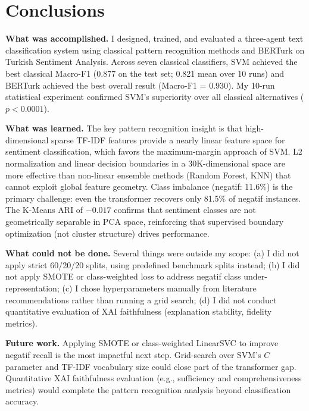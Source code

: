 \documentclass[conference]{IEEEtran}
\begin{document}
\section{Conclusions}
\label{sec:conclusion}

\textbf{What was accomplished.} I designed, trained, and evaluated a three-agent text
classification system using classical pattern recognition methods and BERTurk on Turkish
Sentiment Analysis. Across seven classical classifiers, SVM achieved the best classical
Macro-F1 (0.877 on the test set; 0.821 mean over 10 runs) and BERTurk achieved the best
overall result (Macro-F1 = 0.930). My 10-run statistical experiment confirmed SVM's
superiority over all classical alternatives ($p < 0.0001$).

\textbf{What was learned.} The key pattern recognition insight is that high-dimensional
sparse TF-IDF features provide a nearly linear feature space for sentiment classification,
which favors the maximum-margin approach of SVM. L2 normalization and linear decision
boundaries in a 30K-dimensional space are more effective than non-linear ensemble
methods (Random Forest, KNN) that cannot exploit global feature geometry. Class imbalance
(negatif: 11.6\%) is the primary challenge: even the transformer recovers only 81.5\%
of negatif instances. The K-Means ARI of $-0.017$ confirms that sentiment classes are
not geometrically separable in PCA space, reinforcing that supervised boundary
optimization (not cluster structure) drives performance.

\textbf{What could not be done.} Several things were outside my scope: (a) I did not
apply strict 60/20/20 splits, using predefined benchmark splits instead; (b) I did not
apply SMOTE or class-weighted loss to address negatif class under-representation;
(c) I chose hyperparameters manually from literature recommendations rather than
running a grid search; (d) I did not conduct quantitative evaluation of XAI faithfulness
(explanation stability, fidelity metrics).

\textbf{Future work.} Applying SMOTE or class-weighted LinearSVC to improve negatif
recall is the most impactful next step. Grid-search over SVM's $C$ parameter and TF-IDF
vocabulary size could close part of the transformer gap. Quantitative XAI faithfulness
evaluation (e.g., sufficiency and comprehensiveness metrics) would complete the pattern
recognition analysis beyond classification accuracy.
\end{document}
